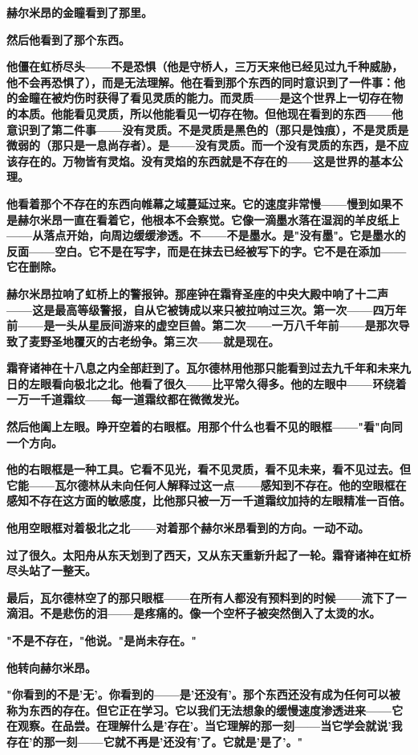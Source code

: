 \documentclass[12pt,a4paper,openany]{ctexbook}
\begin{document}
\textbf{赫尔米昂的金瞳看到了那里。}


\textbf{然后他看到了那个东西。}


\textbf{他僵在虹桥尽头——不是恐惧（他是守桥人，三万天来他已经见过九千种威胁，他不会再恐惧了），而是无法理解。他在看到那个东西的同时意识到了一件事：他的金瞳在被灼伤时获得了看见灵质的能力。而灵质——是这个世界上一切存在物的本质。他能看见灵质，所以他能看见一切存在物。但他现在看到的东西——他意识到了第二件事——没有灵质。不是灵质是黑色的（那只是蚀痕），不是灵质是微弱的（那只是一息尚存者）。是——没有灵质。而一个没有灵质的东西，是不应该存在的。万物皆有灵焰。没有灵焰的东西就是不存在的——这是世界的基本公理。}


\textbf{他看着那个不存在的东西向帷幕之域蔓延过来。它的速度非常慢——慢到如果不是赫尔米昂一直在看着它，他根本不会察觉。它像一滴墨水落在湿润的羊皮纸上——从落点开始，向周边缓缓渗透。不——不是墨水。是"没有墨"。它是墨水的反面——空白。它不是在写字，而是在抹去已经被写下的字。它不是在添加——它在删除。}


\textbf{赫尔米昂拉响了虹桥上的警报钟。那座钟在霜脊圣座的中央大殿中响了十二声——这是最高等级警报，自从它被铸成以来只被拉响过三次。第一次——四万年前——是一头从星辰间游来的虚空巨兽。第二次——一万八千年前——是那次导致了麦野圣地覆灭的古老纷争。第三次——就是现在。}


\textbf{霜脊诸神在十八息之内全部赶到了。瓦尔德林用他那只能看到过去九千年和未来九日的左眼看向极北之北。他看了很久——比平常久得多。他的左眼中——环绕着一万一千道霜纹——每一道霜纹都在微微发光。}


\textbf{然后他阖上左眼。睁开空着的右眼框。用那个什么也看不见的眼框——"看"向同一个方向。}


\textbf{他的右眼框是一种工具。它看不见光，看不见灵质，看不见未来，看不见过去。但它能——瓦尔德林从未向任何人解释过这一点——感知到不存在。他的空眼框在感知不存在这方面的敏感度，比他那只被一万一千道霜纹加持的左眼精准一百倍。}


\textbf{他用空眼框对着极北之北——对着那个赫尔米昂看到的方向。一动不动。}


\textbf{过了很久。太阳舟从东天划到了西天，又从东天重新升起了一轮。霜脊诸神在虹桥尽头站了一整天。}


\textbf{最后，瓦尔德林空了的那只眼框——在所有人都没有预料到的时候——流下了一滴泪。不是悲伤的泪——是疼痛的。像一个空杯子被突然倒入了太烫的水。}


\textbf{"不是不存在，"他说。"是尚未存在。"}


\textbf{他转向赫尔米昂。}


\textbf{"你看到的不是'无'。你看到的——是'还没有'。那个东西还没有成为任何可以被称为东西的存在。但它正在学习。它以我们无法想象的缓慢速度渗透进来——它在观察。在品尝。在理解什么是'存在'。当它理解的那一刻——当它学会就说'我存在'的那一刻——它就不再是'还没有'了。它就是'是了'。"}
\end{document}
